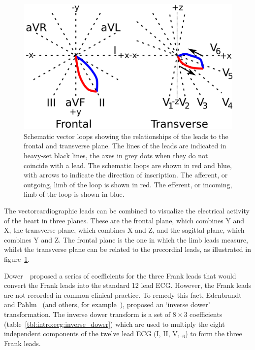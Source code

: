 \begin{figure}
\begin{center}
\includegraphics{figures/intro/vector_loops}
\end{center}
\caption[Schematic Vector Loops]{
\label{fig:intro:ecg:planes}
Schematic vector loops showing the relationships of the leads to the frontal and
transverse plane.
The lines of the leads are indicated in heavy-set black lines, the axes in grey
dots when they do not coincide with a lead.
The schematic loops are shown in red and blue, with arrows to indicate the
direction of inscription.
The afferent, or outgoing, limb of the loop is shown in red.
The efferent, or incoming, limb of the loop is shown in blue.
}
\end{figure}

The vectorcardiographic leads can be combined to visualize the electrical
activity of the heart in three planes.
These are the frontal plane, which combines Y and X, the transverse plane, which
combines X and Z, and the sagittal plane, which combines Y and Z.
The frontal plane is the one in which the limb leads measure, whilst the transverse plane
can be related to the precordial leads, as illustrated in
figure~\ref{fig:intro:ecg:planes}.

Dower~\cite{Dower1980}\ proposed a series of coefficients for the three Frank
leads that would convert the Frank leads into the standard 12 lead ECG.
However, the Frank leads are not recorded in common clinical practice.
To remedy this fact, Edenbrandt and Pahlm~\cite{Edenbrandt1988} (and others, for
example~\cite{Uijen1988}), proposed an `inverse dower' transformation.
The inverse dower transform is a set of $8\times3$ coefficients
(table~\ref{tbl:intro:ecg:inverse_dower}) which are used to multiply the eight
independent components of the twelve lead ECG (I, II, $\text{V}_{\text{1--6}}$)
to form the three Frank leads.


